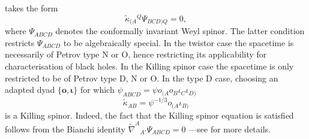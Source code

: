 \documentclass[10pt,a4paper]{article}
\theoremstyle{plain}
\def\bmo{{\bm o}}
\begin{document}
takes the form
\[
\tilde{\kappa}_{(A}{}^Q\Psi_{BCD)Q}=0,
\]
where $\Psi_{ABCD}$ denotes the conformally invariant Weyl spinor.
The latter condition restricts $\Psi_{ABCD}$ to be algebraically
special.  In the twistor case the spacetime is necessarily of Petrov
type N or O, hence restricting its applicability for characterisation
of black holes.  In the Killing spinor case the spacetime is only
restricted to be of Petrov type D, N or O. 
In the type D case, choosing an 
adapted dyad $\lbrace \bmo, \bm\iota\rbrace$ for which $\psi_{ABCD}=\psi o_{(A}o_{B}\iota_C\iota_{D)}$
\[\tilde{\kappa}_{AB} = \psi^{-1/3}o_{(A}\iota_{B)}\]
is a Killing spinor. Indeed, the fact that the Killing spinor equation is satisfied follows from the Bianchi identity $\tilde{\nabla}^A{}_{A'}\Psi_{ABCD}=0$ ---see \cite{PenRin84, WalkerPenrose70} for more details. 
\medskip
\end{document}
